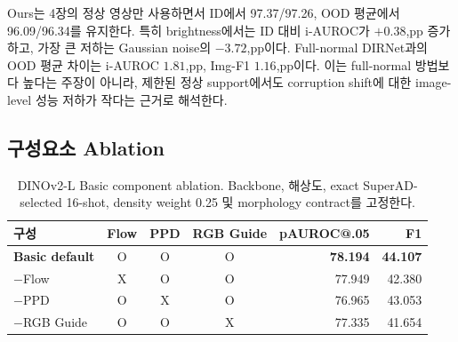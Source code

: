 Ours는 4장의 정상 영상만 사용하면서 ID에서 97.37/97.26, OOD 평균에서
96.09/96.34를 유지한다. 특히 brightness에서는 ID 대비 i-AUROC가
$+0.38$,pp 증가하고, 가장 큰 저하는 Gaussian noise의 $-3.72$,pp이다.
Full-normal DIRNet과의 OOD 평균 차이는 i-AUROC $1.81$,pp, Img-F1
$1.16$,pp이다. 이는 full-normal 방법보다 높다는 주장이 아니라, 제한된 정상
support에서도 corruption shift에 대한 image-level 성능 저하가 작다는 근거로
해석한다.

\subsection{구성요소 Ablation}

\begin{table}[t]
  \centering
  \caption{DINOv2-L Basic component ablation. Backbone, 해상도, exact
  SuperAD-selected 16-shot, density weight 0.25 및 morphology contract를
  고정한다.}
  \label{tab:basic_component_ablation}
  \small
  \begin{tabular}{@{}lcccrr@{}}
    \toprule
    구성 & Flow & PPD & RGB Guide & pAUROC@.05 & F1 \\
    \midrule
    \textbf{Basic default} & O & O & O & \textbf{78.194} & \textbf{44.107} \\
    $-$Flow & X & O & O & 77.949 & 42.380 \\
    $-$PPD & O & X & O & 76.965 & 43.053 \\
    $-$RGB Guide & O & O & X & 77.335 & 41.654 \\
    \bottomrule
  \end{tabular}
\end{table}
